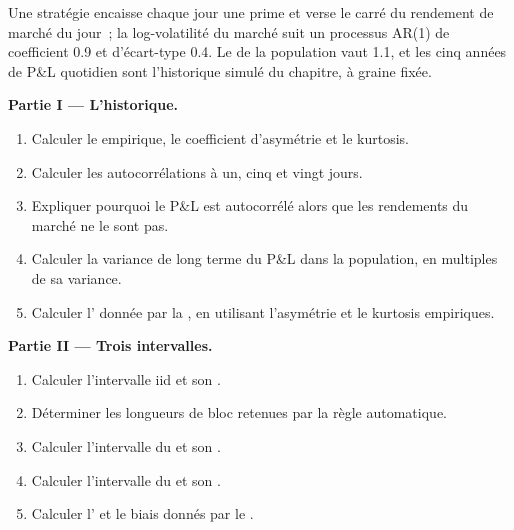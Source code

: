 \begin{problem}\label{pb:qm:resampling:1}
Une stratégie encaisse chaque jour une prime et verse le carré du rendement de marché du jour~; la log-volatilité du marché suit un processus AR(1) de
coefficient 0.9 et d'écart-type 0.4. Le  de la population vaut 1.1, et les cinq années de P\&L quotidien sont
l'historique simulé du chapitre, à graine fixée.

\medskip\noindent\textbf{Partie I --- L'historique.}
\begin{enumerate}
\item Calculer le  empirique, le coefficient d'asymétrie et le kurtosis.
\item Calculer les autocorrélations à un, cinq et vingt jours.
\item Expliquer pourquoi le P\&L est autocorrélé alors que les rendements du marché ne le sont pas.
\item Calculer la variance de long terme du P\&L dans la population, en multiples de sa variance.
\item Calculer l' donnée par la , en utilisant l'asymétrie et le kurtosis empiriques.
\end{enumerate}

\medskip\noindent\textbf{Partie II --- Trois intervalles.}
\begin{enumerate}[resume]
\item Calculer l'intervalle  iid et son .
\item Déterminer les longueurs de bloc retenues par la règle automatique.
\item Calculer l'intervalle du  et son .
\item Calculer l'intervalle du  et son .
\item Calculer l' et le biais donnés par le .
\end{enumerate}


\end{problem}
